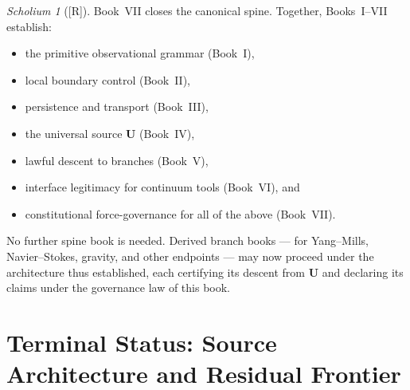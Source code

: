 \documentclass[12pt,oneside]{amsbook}
\theoremstyle{plain}
\theoremstyle{definition}
\theoremstyle{remark}
\newtheorem{scholium}[theorem]{Scholium}
\newcommand{\status}[1]{\textup{[#1]}}
\begin{document}
\medskip

\begin{scholium}[\status{R}]\label{sch:VII-final}
Book~VII closes the canonical spine.  Together, Books~I--VII
establish:
\begin{itemize}
  \item the primitive observational grammar (Book~I),
  \item local boundary control (Book~II),
  \item persistence and transport (Book~III),
  \item the universal source $\mathbf{U}$ (Book~IV),
  \item lawful descent to branches (Book~V),
  \item interface legitimacy for continuum tools (Book~VI), and
  \item constitutional force-governance for all of the above (Book~VII).
\end{itemize}
No further spine book is needed.  Derived branch books --- for
Yang--Mills, Navier--Stokes, gravity, and other endpoints --- may now
proceed under the architecture thus established, each certifying its
descent from $\mathbf{U}$ and declaring its claims under the
governance law of this book.
\end{scholium}


\section{Terminal Status: Source Architecture and Residual Frontier}
\label{sec:terminal-status}
\end{document}
